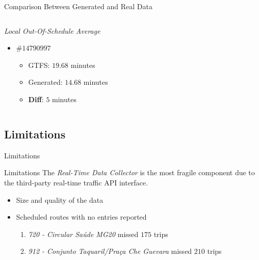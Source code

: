 \documentclass[xcolor=dvipsnames,table]{beamer}
\begin{document}
\begin{frame}{Comparison Between Generated and Real Data}
\begin{columns}
\begin{block}{\textit{Local Out-Of-Schedule Average}}
\begin{itemize}
\begin{itemize}
                                        \end{itemize}
                                \item $\#14790997$ 
                                        \begin{itemize}
                                                \item GTFS: $19.68$ minutes 
                                                \item Generated: $14.68$ minutes 
                                                \item \textbf{Diff}: $5$ minutes 
                                        \end{itemize}
                        \end{itemize}
                \end{block}
        \end{columns}
\end{frame}


\subsection{Limitations}
\begin{frame}{Limitations}
        \begin{block}{Limitations}
                The {\em Real-Time Data Collector} is the most fragile component due
                to the third-party real-time traffic API interface.
                \begin{itemize}
                        \item Size and quality of the data
                        \item Scheduled routes with no entries reported
                                \begin{enumerate}
                                        \item \textit{720 - Circular Saúde MG20} missed $175$ trips
                                        \item \textit{912 - Conjunto Taquaril/Praça Che Guevara} missed $210$ trips
                                \end{enumerate}
                \end{itemize}

        \end{block}
\end{frame}
\end{document}
